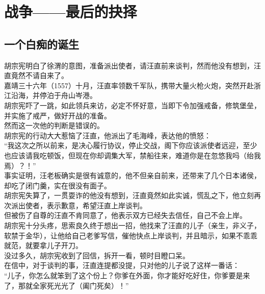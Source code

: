 \section{战争——最后的抉择}
\ifnum{}
	\begin{multicols}{\theparacolNo}
\fi
\subsection{一个白痴的诞生}
胡宗宪明白了徐渭的意图，准备派出使者，请汪直前来谈判，然而他没有想到，汪直竟然不请自来了。\\

嘉靖三十六年（1557）十月，汪直率领数千军队，携带大量火枪火炮，突然开赴浙江沿海，并停泊于舟山岑港。\\

胡宗宪吓了一跳，如此领兵来访，必定不怀好意，当即下令加强戒备，修筑堡垒，并实施了戒严，做好开战的准备。\\

然而这一次他的判断是错误的。\\

胡宗宪的行动大大惹恼了汪直，他派出了毛海峰，表达他的愤怒：\\

“我这次之所以前来，是决心履行协议，停止交战，阁下你应该派使者远迎，至少也应该请我吃顿饭，但现在你却调集大军，禁船往来，难道你是在忽悠我吗（绐我焉）？！”\\

事实证明，汪老板确实是很有诚意的，他不但亲自前来，还带来了几个日本诸侯，却吃了闭门羹，实在很没有面子。\\

胡宗宪失算了，一贯耍诈的他没有想到，汪直竟然如此实诚，慌乱之下，他立刻再次派出使者，表示歉意，希望汪直上岸谈判。\\

但被伤了自尊的汪直不肯同意了，他表示双方已经失去信任，自己不会上岸。\\

胡宗宪十分头疼，思索良久终于想出一招，他找来了汪直的儿子（亲生，非义子，软禁于金华），让他给自己老爹写信，催他快点上岸谈判，并且暗示，如果不乖乖就范，就要拿儿子开刀。\\

没过多久，胡宗宪收到了回信，拆开一看，顿时目瞪口呆。\\

在信中，对于谈判的事，汪直连提都没提，只对他的儿子说了这样一番话：\\

“儿子，你怎么就笨到了这个份上？你爹在外面，你才能好吃好住，你爹要是来了，那就全家死光光了（阖门死矣）！”\\


\end{multicols}
